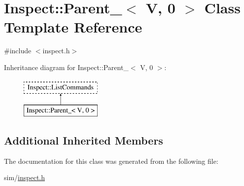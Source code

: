 \hypertarget{class_inspect_1_1_parent___3_01_v_00_010_01_4}{\section{Inspect\+:\+:Parent\+\_\+$<$ V, 0 $>$ Class Template Reference}
\label{class_inspect_1_1_parent___3_01_v_00_010_01_4}
}


{\ttfamily \#include $<$inspect.\+h$>$}

Inheritance diagram for Inspect\+:\+:Parent\+\_\+$<$ V, 0 $>$\+:\begin{figure}[H]
\begin{center}
\leavevmode
\includegraphics[height=2.000000cm]{class_inspect_1_1_parent___3_01_v_00_010_01_4}
\end{center}
\end{figure}
\subsection*{Additional Inherited Members}


The documentation for this class was generated from the following file\+:\begin{DoxyCompactItemize}
\item 
sim/\hyperlink{inspect_8h}{inspect.\+h}\end{DoxyCompactItemize}
